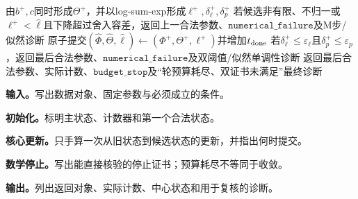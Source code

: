 \begin{AlgorithmContract}
\begin{algorithm}[tbp]
{  
  由$b^+,c$同时形成$\Theta^+$，并以log-sum-exp形成$\ell^+,\delta_\ell^+,\delta_p^+$\;
  若候选非有限、不归一或$\ell^+<\widehat\ell$且下降超过舍入容差，返回上一合法参数、$\mathtt{numerical\_failure}$及M步/似然诊断\;
  原子提交$(\widehat\Phi,\widehat\Theta,\widehat\ell)\leftarrow(\Phi^+,\Theta^+,\ell^+)$并增加$t_{\rm done}$\;
  若$\delta_\ell^+\le\varepsilon_\ell$且$\delta_p^+\le\varepsilon_p$，返回最后合法参数、$\mathtt{numerical\_failure}$及双阈值/似然单调性诊断\;
}
返回最后合法参数、实际计数、$\mathtt{budget\_stop}$及“轮预算耗尽、双证书未满足”最终诊断\;
\end{algorithm}
\end{AlgorithmContract}
\FloatBarrier
{}
\endgroup


\begin{keypointbox}[title={固定主题--词分布的新文档折入：五步阅读}]
\textbf{输入。}写出数据对象、固定参数与必须成立的条件。\par
\textbf{初始化。}标明主状态、计数器和第一个合法状态。\par
\textbf{核心更新。}只手算一次从旧状态到候选状态的更新，并指出何时提交。\par
\textbf{数学停止。}写出能直接核验的停止证书；预算耗尽不等同于收敛。\par
\textbf{输出。}列出返回对象、实际计数、中心状态和用于复核的诊断。
\end{keypointbox}

